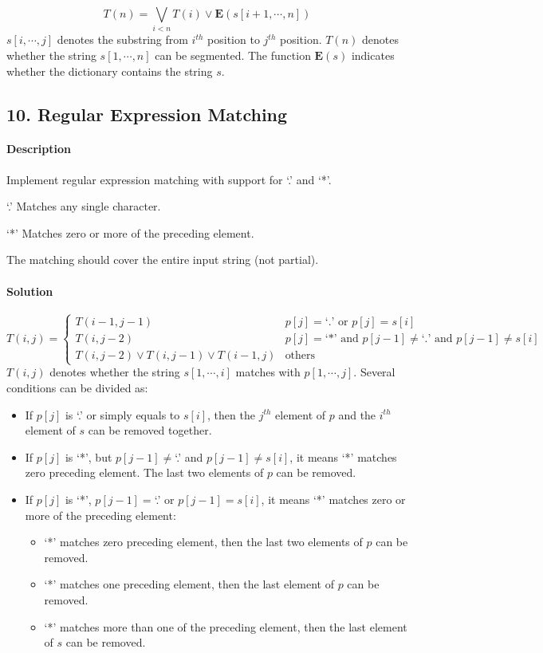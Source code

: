 \documentclass{article}
\begin{document}
$$T(n)=\bigvee\limits_{i<n}{T(i)\vee \bm{E}(s[i+1,\cdots,n])}$$
$s[i,\cdots,j]$ denotes the substring from $i^{th}$ position to $j^{th}$ position. $T(n)$ denotes whether the string $s[1,\cdots,n]$ can be segmented. The function $\bm{E}(s)$ indicates whether the dictionary contains the string $s$.

\subsection{10. Regular Expression Matching}

\paragraph{Description}

Implement regular expression matching with support for `.' and `*'.

`.' Matches any single character.

`*' Matches zero or more of the preceding element.

The matching should cover the entire input string (not partial).

\paragraph{Solution}

\begin{equation*}
T(i,j)=\begin{cases}
T(i-1,j-1) & p[j]=\text{`.' or }p[j]=s[i]\\
T(i,j-2) & p[j]=\text{`*' and }p[j-1]\neq\text{`.' and }p[j-1]\neq s[i]\\
T(i,j-2)\vee T(i,j-1)\vee T(i-1,j) & \text{others}
\end{cases}
\end{equation*}
$T(i,j)$ denotes whether the string $s[1,\cdots,i]$ matches with $p[1,\cdots,j]$. Several conditions can be divided as:
\begin{itemize}
    \item If $p[j]$ is `.' or simply equals to $s[i]$, then the $j^{th}$ element of $p$ and the $i^{th}$ element of $s$ can be removed together.
    \item If $p[j]$ is `*', but $p[j-1]\neq$`.' and $p[j-1]\neq s[i]$, it means `*' matches zero preceding element. The last two elements of $p$ can be removed.
    \item If $p[j]$ is `*', $p[j-1]=$`.' or $p[j-1]=s[i]$, it means `*' matches zero or more of the preceding element:
    \begin{itemize}
        \item `*' matches zero preceding element, then the last two elements of $p$ can be removed.
        \item `*' matches one preceding element, then the last element of $p$ can be removed.
        \item `*' matches more than one of the preceding element, then the last element of $s$ can be removed.
    \end{itemize}
\end{itemize}
\end{document}
